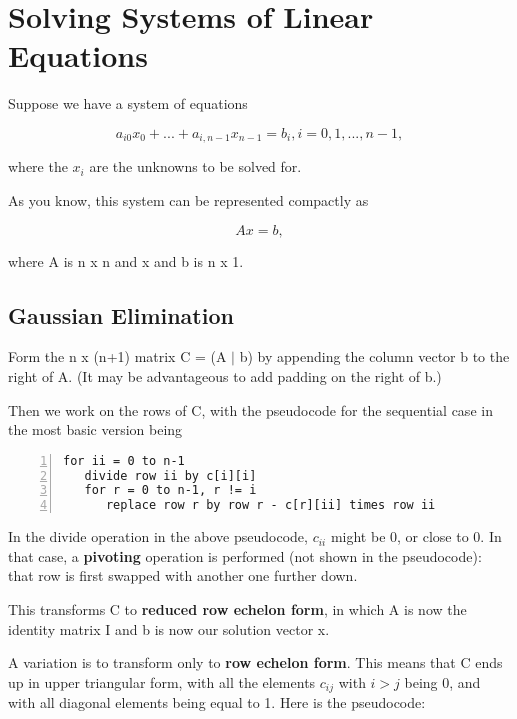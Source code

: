 \section{Solving Systems of Linear Equations}
\label{solvelin}

Suppose we have a system of equations

\begin{equation}
\label{linsyst}
a_{i0} x_0 + ... + a_{i,n-1} x_{n-1} = b_i, i = 0,1,...,n-1,
\end{equation}

where the $x_i$ are the unknowns to be solved for.

As you know, this system can be represented compactly as 

\begin{equation}
\label{lin}
Ax = b,
\end{equation}

where A is n x n and x and b is n x 1.

\subsection{Gaussian Elimination}
\label{gauss}

Form the n x (n+1) matrix C = (A $|$ b) by appending the column vector b
to the right of A.  (It may be advantageous to add padding on the
right of b.)

Then we work on the rows of C, with the pseudocode for the sequential
case in the most basic version being

\begin{lstlisting}[numbers=left]
for ii = 0 to n-1
   divide row ii by c[i][i]
   for r = 0 to n-1, r != i  
      replace row r by row r - c[r][ii] times row ii
\end{lstlisting}

In the divide operation in the above pseudocode, $c_{ii}$ might be 0, or
close to 0.  In that case, a {\bf pivoting} operation is performed (not
shown in the pseudocode):  that row is first swapped with another one
further down. 

This transforms C to {\bf reduced row echelon form}, in which A is now
the identity matrix I and b is now our solution vector x.

A variation is to transform only to {\bf row echelon form}.  This means
that C ends up in upper triangular form, with all the elements $c_{ij}$
with $i > j$ being 0, and with all diagonal elements being equal to 1.
Here is the pseudocode:

